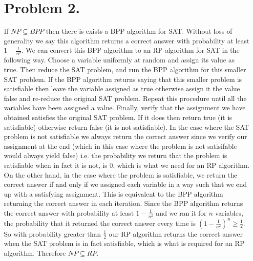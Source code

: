 \documentclass[12pt]{article}
\begin{document}
\newpage
\section*{Problem 2.}
If $NP \subseteq BPP$ then there is exists a BPP algorithm for SAT. Without
loss of generality we say this algorithm returns a correct answer with probability
at least $1 - \frac{1}{n^2}$. We can convert this BPP algorithm to an RP
algorithm for SAT in the following way. Choose a variable uniformly at random
and assign its value as true. Then reduce the SAT problem, and run the BPP
algorithm for this smaller SAT problem. If the BPP algorithm returns saying that this smaller
problem is satisfiable then leave the variable assigned as true otherwise assign
it the value false and re-reduce the original SAT problem. Repeat this procedure
until all the variables have been assigned a value. Finally, verify that the
assignment we have obtained satisfies the original SAT problem. If it does then
return true (it is satisfiable) otherwise return false (it is not satisfiable).
In the case where the SAT problem is not satisfiable we always return the correct
answer since we verify our assignment at the end (which in this case where the
problem is not satisifable would always yield false) i.e. the probability we
return that the problem is satisfiable when in fact it is not, is 0, which is what
we need for an RP algorithm. On the other hand, in the case where the problem is
satisfiable, we return the correct answer if and only if we assigned each variable
in a way such that we end up with a satisfying assignment. This is equivalent to
the BPP algorithm returning the correct answer in each iteration. Since the BPP
algorithm returns the correct answer with probability at least
$1 - \frac{1}{n^2}$ and we ran it for $n$ variables, the probability that it
returned the correct answer every time is
$(1 - \frac{1}{n^2})^n \ge \frac{1}{2}$. So with probability greater than
$\frac{1}{2}$ our RP algorithm returns the correct answer when the SAT problem
is in fact satisfiable, which is what is required for an RP algorithm.
Therefore $NP \subseteq RP$.

\newpage
\end{document}
